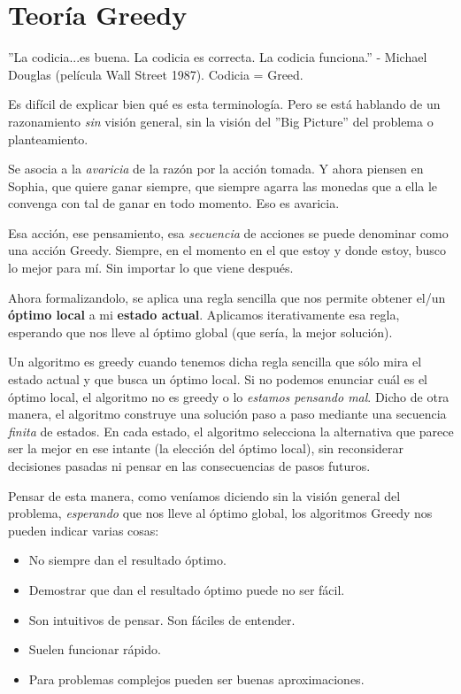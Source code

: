 \section{Teoría Greedy}

''La codicia...es buena. La codicia es correcta. La codicia funciona.'' - Michael Douglas (película Wall Street 1987).
Codicia = Greed. 

Es difícil de explicar bien qué es esta terminología. Pero se está hablando de un razonamiento \textit{sin} visión general, sin la visión del ''Big Picture'' del problema o planteamiento.

Se asocia a la \textit{avaricia} de la razón por la acción tomada. Y ahora piensen en Sophia, que quiere ganar siempre, que siempre agarra las monedas que a ella le convenga con tal de ganar en todo momento. Eso es avaricia.

Esa acción, ese pensamiento, esa \textit{secuencia} de acciones se puede denominar como una acción Greedy. Siempre, en el momento en el que estoy y donde estoy, busco lo mejor para mí. Sin importar lo que viene después.

Ahora formalizandolo, se aplica una regla sencilla que nos permite obtener el/un \textbf{óptimo local} a mi \textbf{estado actual}. Aplicamos iterativamente esa regla, esperando que nos lleve al óptimo global (que sería, la mejor solución).

Un algoritmo es greedy cuando tenemos dicha regla sencilla que sólo mira el estado actual y que busca un óptimo local. Si no podemos enunciar cuál es el óptimo local, el algoritmo no es greedy o lo \textit{estamos pensando mal}.
Dicho de otra manera, el algoritmo construye una solución paso a paso mediante una secuencia \textit{finita} de estados. En cada estado, el algoritmo selecciona la alternativa que parece ser la mejor en ese intante (la elección del óptimo local), sin reconsiderar decisiones pasadas ni pensar en las consecuencias de pasos futuros.

Pensar de esta manera, como veníamos diciendo sin la visión general del problema, \textit{esperando} que nos lleve al óptimo global, los algoritmos Greedy nos pueden indicar varias cosas:
\begin{itemize}
    \item No siempre dan el resultado óptimo.
    \item Demostrar que dan el resultado óptimo puede no ser fácil.
    \item Son intuitivos de pensar. Son fáciles de entender.
    \item Suelen funcionar rápido.
    \item Para problemas complejos pueden ser buenas aproximaciones.
\end{itemize}

